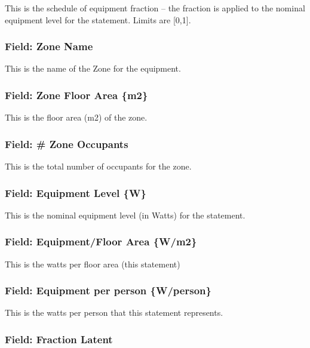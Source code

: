 This is the schedule of equipment fraction -- the fraction is applied to the nominal equipment level for the statement. Limits are {[}0,1{]}.

\subsubsection{Field: Zone Name}\label{field-zone-name-5}

This is the name of the Zone for the equipment.

\subsubsection{Field: Zone Floor Area \{m2\}}\label{field-zone-floor-area-m2-3}

This is the floor area (m2) of the zone.

\subsubsection{Field: \# Zone Occupants}\label{field-zone-occupants-3}

This is the total number of occupants for the zone.

\subsubsection{Field: Equipment Level \{W\}}\label{field-equipment-level-w-1}

This is the nominal equipment level (in Watts) for the statement.

\subsubsection{Field: Equipment/Floor Area \{W/m2\}}\label{field-equipmentfloor-area-wm2-1}

This is the watts per floor area (this statement)

\subsubsection{Field: Equipment per person \{W/person\}}\label{field-equipment-per-person-wperson-1}

This is the watts per person that this statement represents.

\subsubsection{Field: Fraction Latent}\label{field-fraction-latent-1}

